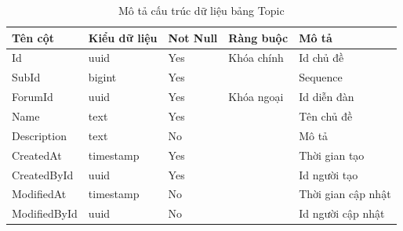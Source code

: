 \documentclass[../index.tex]{subfiles}
\begin{document}
    \begin{table}[H]
        \begin{tabular}{ |p{3cm}|p{2.5cm}|p{1.6cm}|p{2.2cm}|p{3cm}| }
            \hline
            Tên cột      & Kiểu dữ liệu             & Not Null & Ràng buộc  & Mô tả              \\
            \hline
            Id           & uuid                     & Yes      & Khóa chính & Id chủ đề          \\
            \hline
            SubId        & bigint                   & Yes      &            & Sequence           \\
            \hline
            ForumId      & uuid                     & Yes      & Khóa ngoại & Id diễn đàn        \\
            \hline
            Name         & text    & Yes      &            & Tên chủ đề         \\
            \hline
            Description  & text    & No       &            & Mô tả              \\
            \hline
            CreatedAt    & timestamp & Yes      &            & Thời gian tạo      \\
            \hline
            CreatedById  & uuid                     & Yes      &            & Id người tạo       \\
            \hline
            ModifiedAt   & timestamp & No       &            & Thời gian cập nhật \\
            \hline
            ModifiedById & uuid                     & No       &            & Id người cập nhật  \\
            \hline
        \end{tabular}
        \caption{Mô tả cấu trúc dữ liệu bảng Topic}
    \end{table}
\end{document}
